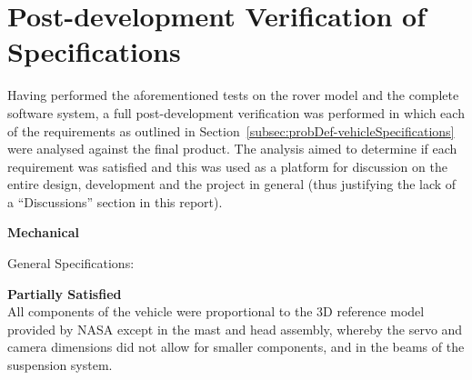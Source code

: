 \section{Post-development Verification of Specifications}
  Having performed the aforementioned tests on the rover model and the complete software system, a full post-development verification was performed in which each of the requirements as outlined in Section~\ref{subsec:probDef-vehicleSpecifications} were analysed against the final product. The analysis aimed to determine if each requirement was satisfied and this was used as a platform for discussion on the entire design, development and the project in general (thus justifying the lack of a ``Discussions'' section in this report).
  
  \begin{itemize}
    \item \textbf{Mechanical}
    \begin{RM}
      \item General Specifications:
      \begin{RM}
        \item \textbf{Partially Satisfied}\\
        All components of the vehicle were proportional to the 3D reference model \cite{nasa3Dprint} provided by NASA except in the mast and head assembly, whereby the servo and camera dimensions did not allow for smaller components, and in the beams of the suspension system.
        

\end{RM}
\end{RM}
\end{itemize}
